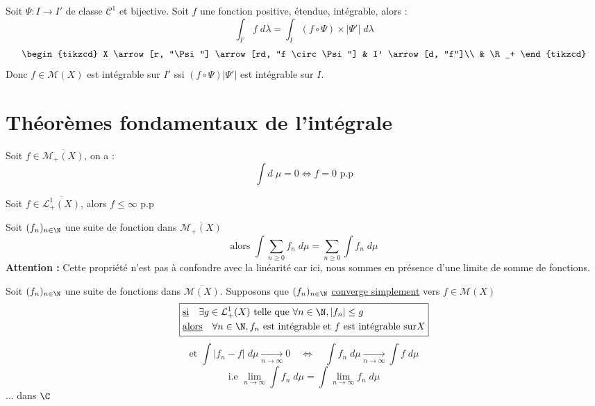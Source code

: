 \begin{theorem}
    Soit $\Psi : I \rightarrow I'$ de classe $\mathcal{C}^1$ et bijective. Soit $f$ une fonction positive, étendue, intégrable, alors :
        \[ \boxed{ \int_{I'} f \; d \lambda = \int_I (f \circ \Psi) \times |\Psi ' | \; d \lambda } \] 
    \[ 
		\begin{tikzcd}
			X \arrow[r, "\Psi"] \arrow[rd, "f \circ \Psi"] & I' \arrow[d, "f"]\\
                                                           & \R_+ 
		\end{tikzcd}
	\]
    Donc $f \in \mathcal{M}(X)$ est intégrable sur $I'$ ssi $(f \circ \Psi) |\Psi ' |$ est intégrable sur $I$.
\end{theorem}



\section{Théorèmes fondamentaux de l'intégrale}

\begin{theorem}
    Soit $f \in \overline{\mathcal{M}_+(X)}$, on a :
        \[ \int d \; \mu = 0 \Longleftrightarrow f = 0 \text{ p.p} \]
\end{theorem}

\begin{theorem}
    Soit $f \in \overline{\mathcal{L}_+^1(X)}$, alors $f \le \infty $ p.p 
\end{theorem}

\newpage

\begin{theorem}
    Soit $(f_n)_{n\in\N}$ une suite de fonction dans $\overline{\mathcal{M}_+(X)}$ 
        \[ \text{alors } \int \sum_{n \geq 0} f_n \; d \mu = \sum_{n \geq 0} \int f_n \; d \mu \] 
    \textbf{Attention :} Cette propriété n'est pas à confondre avec la linéarité car ici, nous sommes en présence d'une limite de somme de fonctions.
\end{theorem}

\begin{theorem}
    Soit $(f_n)_{n\in\N}$ une suite de fonctions dans $\overline{\mathcal{M}(X)}$.
    Supposons que $(f_n)_{n\in\N}$ \underline{converge simplement} vers $f \in \mathcal{M}(X)$ 
    \[ \boxed{
    \begin{aligned}
        & \text{\underline{si}} \quad  \exists g \in \mathcal{L}_+^1(X) \text{ telle que } \forall n \in \N, |f_n| \leq g \\
        & \text{\underline{alors}} \quad \forall n \in \N, f_n \text{ est intégrable et }  f \text{ est intégrable sur} X
    \end{aligned} }
    \]
    \[ \text{et } \int \Big| f_n - f \Big| \; d \mu \underset{n \to \infty}{\longrightarrow} 0 \quad \Longleftrightarrow \quad  \int f_n \; d \mu \underset{n \to \infty}{\longrightarrow} \int f \; d \mu \] 
    \[ \text{i.e } \lim_{n \to \infty} \int f_n \; d \mu = \int \lim_{n \to \infty} f_n \; d \mu \] 
    ... dans $\C$
\end{theorem}

